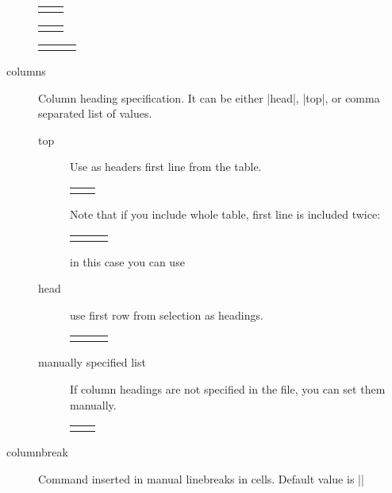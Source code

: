 \documentclass{ltxdoc}
\begin{document}
\begin{description}
\begin{LTXexample}
\begin{tabular}{ll}
\end{tabular}     
\end{LTXexample}  

\begin{LTXexample}
\begin{tabular}{ll}
\end{tabular}     
\end{LTXexample}  

\begin{LTXexample}
\begin{tabular}{lll}
\end{tabular}     
\end{LTXexample}  

\item[columns] Column heading specification. It can be either |head|, |top|, or comma separated list of values.
\begin{description}
\item[top] Use as headers first line from the table.
\begin{LTXexample}
\begin{tabular}{ll}
\end{tabular}
\end{LTXexample}
Note that if you include whole table, first line is included twice:
\begin{LTXexample}
\begin{tabular}{lll}
\end{tabular}     
\end{LTXexample}
in this case you can use
\item[head] use first row from selection as headings.
\begin{LTXexample}
\begin{tabular}{lll}
\end{tabular}     
\end{LTXexample}
\item[manually specified list] If column headings are not specified in the file, you can set them manually.
\begin{LTXexample}
\begin{tabular}{ll}
\end{tabular}     
\end{LTXexample}
\end{description}
\item[columnbreak] Command inserted in manual linebreaks in cells. Default value is |\linebreak|


\end{description}
\end{document}

